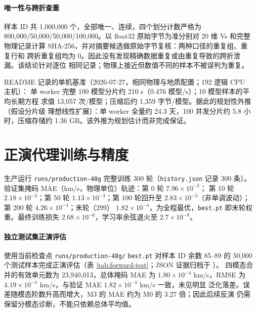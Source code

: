 \documentclass[UTF8,a4paper,11pt]{ctexart}
\begin{document}
\paragraph{唯一性与跨折查重}
样本 ID 共 1{,}000{,}000 个，全部唯一、连续，四个划分计数严格为
800{,}000/50{,}000/50{,}000/100{,}000。以 float32 原始字节为准分别对 20 维 Vs
和完整物理记录计算 SHA-256，并对摘要候选做原始字节复核：两种口径的重复组、重复行和
跨折重复组均为 0。因此没有发现精确数据重复或由重复导致的跨折泄漏。该结论针对逐位
相同记录；物理上接近但数值不同的样本不被误判为重复。

README 记录的单机基准（2026-07-27，相同物理与地质配置；192 逻辑 CPU 主机）：
单 worker 完整 100 模型分片约 210 s（0.476 模型/s）；10 模型样本的平均长期方程
求值 13{,}057 次/模型；压缩后约 1{,}359 字节/模型。据此的规划性外推（假设分片级
理想线性扩展）：单 worker 全量约 24.3 天，100 并发分片约 5.8 小时，压缩存储约
1.36 GB。该外推为规划估计而非完成保证。

\section{正演代理训练与精度}\label{sec:surrogate}
生产运行 \texttt{runs/production-48g} 完整训练 300 轮（\texttt{history.json} 记录
300 条）。验证集掩码 MAE（km/s，物理单位）轨迹：第 0 轮 \(7.96\times10^{-3}\)；
第 10 轮 \(2.18\times10^{-3}\)；第 50 轮 \(1.13\times10^{-3}\)；第 100 轮回升至
\(2.83\times10^{-3}\)（非单调波动）；第 200 轮 \(4.26\times10^{-4}\)；末轮（299）
\(1.82\times10^{-4}\)，为全程最优，\texttt{best.pt} 即末轮权重。最终训练损失
\(2.68\times10^{-6}\)，学习率余弦退火至 \(2.7\times10^{-8}\)。

\paragraph{独立测试集正演评估}
使用当前检查点 \texttt{runs/}\allowbreak\texttt{production-48g/}\allowbreak
\texttt{best.pt} 对样本 ID 余数 85--89 的
50{,}000 个测试样本完成正演评估（表 \ref{tab:forward-test}；JSON 证据归档于
）。
四模态合并的有效单元数为
23{,}940{,}013，总体掩码 MAE 为 \(1.80\times10^{-4}\) km/s，RMSE 为
\(4.19\times10^{-4}\) km/s，与验证 MAE \(1.82\times10^{-4}\) km/s 一致，未见明显
泛化落差。误差随模态阶数升高而增大，M3 的 MAE 约为 M0 的 3.27 倍；因此后续反演
仍需保留分模态诊断，不能只依赖总体平均值。
\end{document}
